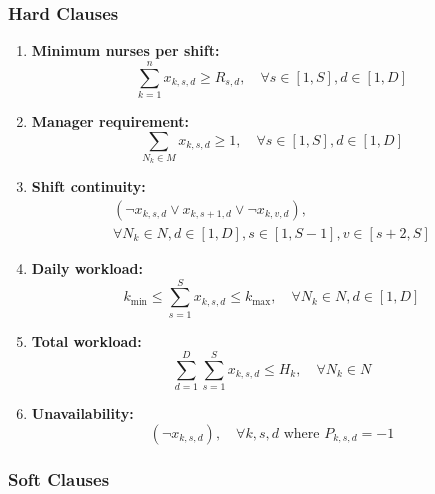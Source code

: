 \documentclass[sigconf, 11pt]{acmart}
\begin{document}
\subsubsection{Hard Clauses}

\begin{enumerate}
    \item \textbf{Minimum nurses per shift:}
    \begin{equation}
        \sum_{k=1}^{n} x_{k,s,d} \geq R_{s,d}, \quad \forall s \in [1,S], d \in [1,D]
    \end{equation}

    \item \textbf{Manager requirement:}
    \begin{equation}
        \sum_{N_k \in M} x_{k,s,d} \geq 1, \quad \forall s \in [1,S], d \in [1,D]
    \end{equation}

    \item \textbf{Shift continuity:}
    \begin{equation}
    \begin{gathered}
        ( \neg x_{k,s,d} \lor x_{k,s+1,d} \lor \neg x_{k,v,d} ), \\
        \forall N_k \in N, d \in [1,D], s \in [1,S-1], v \in [s+2,S]
    \end{gathered}
    \end{equation}

    \item \textbf{Daily workload:}
    \begin{equation}
        k_{\min} \leq \sum_{s=1}^{S} x_{k,s,d} \leq k_{\max}, \quad \forall N_k \in N, d \in [1,D]
    \end{equation}

    \item \textbf{Total workload:}
    \begin{equation}
        \sum_{d=1}^{D} \sum_{s=1}^{S} x_{k,s,d} \leq H_k, \quad \forall N_k \in N
    \end{equation}

    \item \textbf{Unavailability:}
    \begin{equation}
        (\neg x_{k,s,d}), \quad \forall k,s,d \text{ where } P_{k,s,d} = -1
    \end{equation}
\end{enumerate}

\subsubsection{Soft Clauses}
\end{document}
